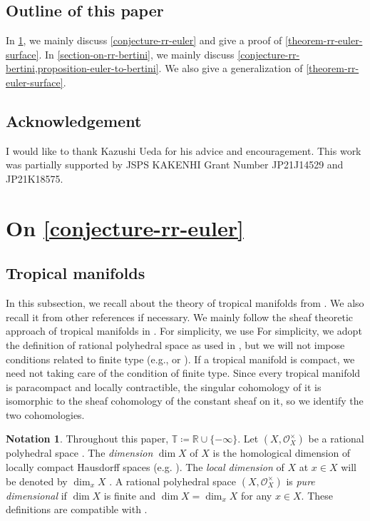 \documentclass[a4paper,dvipdfmx,reqno,12pt]{amsart}
\theoremstyle{definition}
\newtheorem{notation}[theorem]{Notation}
\newcommand{\deq}{\coloneqq}
\numberwithin{equation}{section}
\begin{document}
\subsection{Outline of this paper}
In \cref{section-on-rr-euler}, we mainly
discuss \cref{conjecture-rr-euler} and
give a proof of \cref{theorem-rr-euler-surface}.
In \cref{section-on-rr-bertini}, we mainly
discuss \cref{conjecture-rr-bertini,proposition-euler-to-bertini}.
We also give a generalization of
\cref{theorem-rr-euler-surface}.

\subsection*{Acknowledgement}
I would like to thank Kazushi Ueda for his advice
and encouragement. This work was partially supported 
by JSPS KAKENHI Grant Number JP21J14529 and JP21K18575.

\section{On \cref{conjecture-rr-euler}}
\label{section-on-rr-euler}
\subsection{Tropical manifolds}
In this subsection, we recall about 
the theory of tropical manifolds from
\cite{shaw2011tropical,MR3330789,mikhalkin2018tropical,MR4637248,demedrano2023chern}.
We also recall it from other references if necessary.
We mainly follow the sheaf theoretic approach of
tropical manifolds in \cite{MR4637248}.
For simplicity, we use 
For simplicity, we adopt the definition of
rational polyhedral space
as used in \cite[Definition 6.1]{gross2019sheaftheoretic},
but we will not impose conditions related to finite type 
(e.g., \cite[Definition 7.1.14]{mikhalkin2018tropical} 
or \cite[Definition 2.3 (4)]{demedrano2023chern}).
If a tropical manifold is compact, we need not
taking care of the condition of finite type. 
Since every tropical manifold is paracompact and
locally contractible, the singular cohomology
of it is isomorphic to the sheaf cohomology
of the constant sheaf on it, so we identify
the two cohomologies.

\begin{notation}
Throughout this paper, $\mathbb{T}\deq 
\mathbb{R}\cup\{-\infty\}$.
Let $(X,\mathcal{O}_X^{\times})$ be a rational
polyhedral space \cite[Definition 2.2]{MR4246795}.
The \emph{dimension} $\dim X$ of $X$ is 
the homological dimension of locally compact
Hausdorff spaces (e.g.
\cite[Chapter III. Definition 9.4]{MR842190}).
The \emph{local dimension} of $X$ at $x\in X$
will be denoted by $\dim_x X$
\cite[Chapter III. Definition 9.10]{MR842190}.
A rational polyhedral space $(X,\mathcal{O}_X^{\times})$
is \emph{pure dimensional} if $\dim X$ is finite and
$\dim X=\dim_x X$ for any $x\in X$.
These definitions are compatible with
\cite[Definition 7.1.1]{mikhalkin2018tropical}.
\end{notation}
\end{document}
